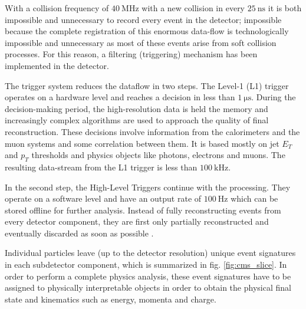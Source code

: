 
With a collision frequency of $\SI{40}{\mega\hertz}$ with a new collision in every $\SI{25}{\nano\second}$ it is both impossible and unnecessary to record every event in the detector; impossible because the complete registration of this enormous data-flow is technologically impossible and unnecessary as most of these events arise from soft collision processes. For this reason, a filtering (triggering) mechanism has been implemented in the detector.

The trigger system reduces the dataflow in two steps. The Level-1 (L1) trigger operates on a hardware level and reaches a decision in less than $\SI{1}{\micro\second}$. During the decision-making period, the high-resolution data is held the memory and increasingly complex algorithms are used to approach the quality of final reconstruction. These decisions involve information from the calorimeters and the muon systems and some correlation between them. It is based mostly on jet $E_T$ and $p_T$ thresholds and physics objects like photons, electrons and muons. The resulting data-stream from the L1 trigger is less than $\SI{100}{\kilo\hertz}$.

In the second step, the High-Level Triggers continue with the processing. They operate on a software level and have an output rate of $\SI{100}{\hertz}$ which can be stored offline for further analysis. Instead of fully reconstructing events from every detector component, they are first only partially reconstructed and eventually discarded as soon as possible \cite{Bayatian:922757}.


Individual particles leave (up to the detector resolution) unique event signatures in each subdetector component, which is summarized in fig. \ref{fig:cms_slice}. In order to perform a complete physics analysis, these event signatures have to be assigned to physically interpretable objects in order to obtain the physical final state and kinematics such as energy, momenta and charge.

